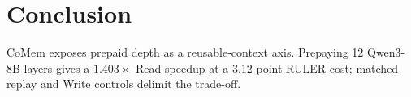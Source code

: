 \section{Conclusion}
\label{sec:conclusion}

CoMem exposes prepaid depth as a reusable-context axis. Prepaying 12 Qwen3-8B
layers gives a $1.403\times$ Read speedup at a 3.12-point RULER cost; matched
replay and Write controls delimit the trade-off.
